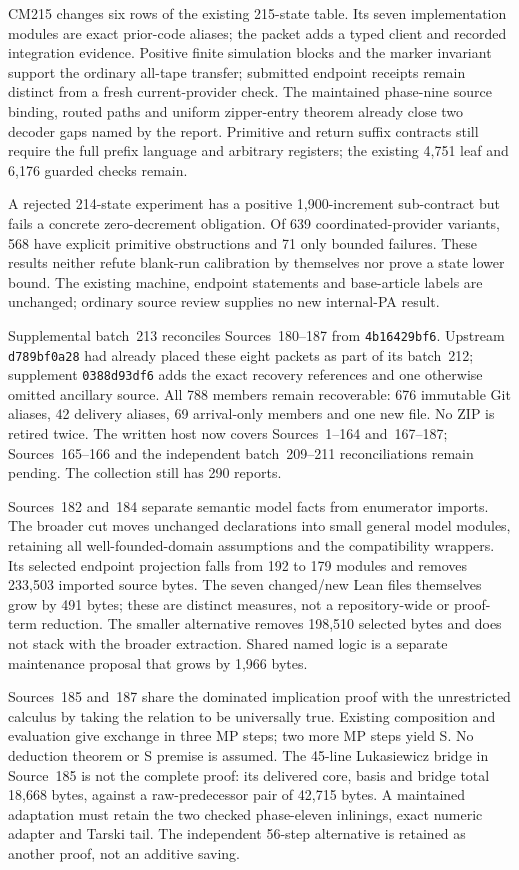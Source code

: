 \documentclass[11pt]{article}
\begin{document}
{CM215 changes six rows of the existing 215-state table. Its seven implementation
modules are exact prior-code aliases; the packet adds a typed client and
recorded integration evidence. Positive finite simulation blocks and the
marker invariant support the ordinary all-tape transfer; submitted endpoint
receipts remain distinct from a fresh current-provider check. The maintained
phase-nine source binding, routed paths and uniform zipper-entry theorem
already close two decoder gaps named by the report. Primitive and return
suffix contracts still require the full prefix language and arbitrary registers;
the existing 4,751 leaf and 6,176 guarded checks remain.

A rejected 214-state experiment has a positive 1,900-increment sub-contract
but fails a concrete zero-decrement obligation. Of 639 coordinated-provider
variants, 568 have explicit primitive obstructions and 71 only bounded failures.
These results neither refute blank-run calibration by themselves nor prove a
state lower bound. The existing machine, endpoint statements and base-article
labels are unchanged; ordinary source review supplies no new internal-PA result.

Supplemental batch~213 reconciles Sources~180--187 from \texttt{4b16429bf6}.
Upstream \texttt{d789bf0a28} had already placed these eight packets as part of
its batch~212; supplement \texttt{0388d93df6} adds the exact recovery references
and one otherwise omitted ancillary source. All 788 members remain recoverable:
676 immutable Git aliases, 42 delivery aliases, 69 arrival-only members and one
new file. No ZIP is retired twice. The written host now covers Sources~1--164
and~167--187; Sources~165--166 and the independent batch~209--211 reconciliations
remain pending. The collection still has 290 reports.

Sources~182 and~184 separate semantic model facts from enumerator imports.
The broader cut moves unchanged declarations into small general model modules,
retaining all well-founded-domain assumptions and the compatibility wrappers.
Its selected endpoint projection falls from 192 to 179 modules and removes
233,503 imported source bytes. The seven changed/new Lean files themselves
grow by 491 bytes; these are distinct measures, not a repository-wide or
proof-term reduction. The smaller alternative removes 198,510 selected bytes
and does not stack with the broader extraction. Shared named logic is a
separate maintenance proposal that grows by 1,966 bytes.

Sources~185 and~187 share the dominated implication proof with the unrestricted
calculus by taking the relation to be universally true. Existing composition
and evaluation give exchange in three MP steps; two more MP steps yield S.
No deduction theorem or S premise is assumed. The 45-line Lukasiewicz bridge
in Source~185 is not the complete proof: its delivered core, basis and bridge
total 18,668 bytes, against a raw-predecessor pair of 42,715 bytes. A maintained
adaptation must retain the two checked phase-eleven inlinings, exact numeric
adapter and Tarski tail. The independent 56-step alternative is retained as
another proof, not an additive saving.

}
\end{document}
